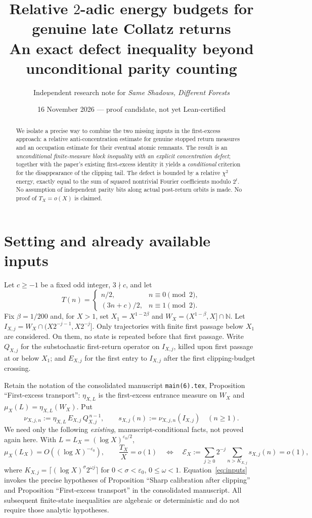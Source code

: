 \documentclass[11pt,a4paper]{article}
\title{\texorpdfstring{Relative $2$-adic energy budgets}{Relative 2-adic energy budgets} for genuine late Collatz returns\\\large An exact defect inequality beyond unconditional parity counting}
\author{Independent research note for \textit{Same Shadows, Different Forests}}
\date{16 November 2026 --- proof candidate, not yet Lean-certified}
\newcommand{\N}{\mathbb N}
\begin{document}
\maketitle
\begin{abstract}
We isolate a precise way to combine the two missing inputs in the first-excess approach: a relative anti-concentration estimate for genuine stopped return measures and an occupation estimate for their eventual atomic remnants.  The result is an \emph{unconditional finite-measure block inequality with an explicit concentration defect}; together with the paper's existing first-excess identity it yields a \emph{conditional} criterion for the disappearance of the clipping tail. The defect is bounded by a relative $\chi^2$ energy, exactly equal to the sum of squared nontrivial Fourier coefficients modulo $2^t$. No assumption of independent parity bits along actual post-return orbits is made. No proof of $T_X=o(X)$ is claimed.
\end{abstract}

\section{Setting and already available inputs}
Let $c\ge-1$ be a fixed odd integer, $3\nmid c$, and let
\[
  T(n)=\begin{cases}n/2,&n\equiv0\pmod2,\\(3n+c)/2,&n\equiv1\pmod2.\end{cases}
\]
Fix $\beta=1/200$ and, for $X>1$, set $X_1=X^{1-2\beta}$ and
$W_X=(X^{1-\beta},X]\cap\N$.  Let
$I_{X,j}=W_X\cap(X2^{-j-1},X2^{-j}]$.
Only trajectories with finite first passage below $X_1$ are considered. On them, no state is repeated before that first passage. Write $Q_{X,j}$ for the substochastic first-return operator on $I_{X,j}$, killed upon first passage at or below $X_1$; and $E_{X,j}$ for the first entry to $I_{X,j}$ after the first clipping-budget crossing.

Retain the notation of the consolidated manuscript \texttt{main(6).tex}, Proposition ``First-excess transport'': $\eta_{X,L}$ is the first-excess entrance measure on $W_X$ and $\mu_X(L)=\eta_{X,L}(W_X)$. Put
\[
   \nu_{X,j,n}:=\eta_{X,L}\,E_{X,j}\,Q_{X,j}^{\,n-1},\qquad
   s_{X,j}(n):=\nu_{X,j,n}(I_{X,j})\quad(n\ge1).
\]
We need only the following \emph{existing}, manuscript-conditional facts, not proved again here. With $L=L_X=(\log X)^{\varepsilon_0/2}$,
\begin{equation}\label{eq:inputs}
 \mu_X(L_X)=O((\log X)^{-\varepsilon_0}),\qquad
 \frac{T_X}{X}=o(1)\quad\Longleftrightarrow\quad
 \mathcal E_X:=\sum_{j\ge0}2^{-j}\sum_{n>K_{X,j}}s_{X,j}(n)=o(1),
\end{equation}
where $K_{X,j}=\lceil(\log X)^\sigma2^{\omega j}\rceil$ for $0<\sigma<\varepsilon_0$, $0\le\omega<1$. Equation~\eqref{eq:inputs} invokes the precise hypotheses of Proposition ``Sharp calibration after clipping'' and Proposition ``First-excess transport'' in the consolidated manuscript. All subsequent finite-state inequalities are algebraic or deterministic and do not require those analytic hypotheses.
\end{document}

